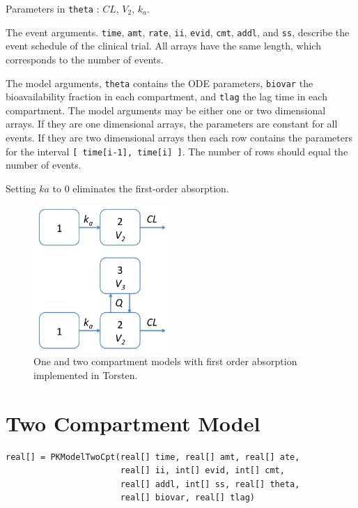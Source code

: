 \documentclass[11pt, reqno]{amsbook}
\numberwithin{section}{chapter}
\theoremstyle{remark}
\begin{document}
Parameters in \texttt{theta} : \(CL\), \(V_2\), \(k_a\).

The event arguments. \texttt{time}, \texttt{amt}, \texttt{rate}, \texttt{ii}, \texttt{evid}, \texttt{cmt}, \texttt{addl}, and
\texttt{ss}, describe the event schedule of the clinical
trial. All arrays have the same length, which
corresponds to the number of events.

The model arguments, \texttt{theta} contains the ODE
parameters, \texttt{biovar} the bioavailability fraction in each
compartment, and \texttt{tlag} the
lag time in each compartment. The model arguments may be either one
or two dimensional arrays. If they are one dimensional arrays, the
parameters are constant for all events. If they are two dimensional
arrays then each row contains the parameters for the interval
\texttt{[ time[i-1], time[i] ]}. The number of rows should equal the
number of events.

Setting \(ka\) to 0 eliminates the first-order absorption.

\begin{figure}[htbp]
\centering
\includegraphics[width=2.0in]{./graphics/cptModels.png}
\caption{\label{fig:orge46f6ee}
One and two compartment models with first order absorption implemented in Torsten.}
\end{figure}

\section{Two Compartment Model}
\label{sec:org442e92f}
\begin{verbatim}
real[] = PKModelTwoCpt(real[] time, real[] amt, real[] ate,
                       real[] ii, int[] evid, int[] cmt,
                       real[] addl, int[] ss, real[] theta,
                       real[] biovar, real[] tlag)
\end{verbatim}
\end{document}
